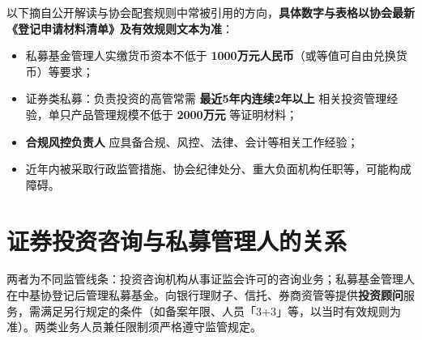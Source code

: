 以下摘自公开解读与协会配套规则中常被引用的方向，\textbf{具体数字与表格以协会最新《登记申请材料清单》及有效规则文本为准}：

\begin{itemize}
  \item 私募基金管理人实缴货币资本不低于 \textbf{1000万元人民币}（或等值可自由兑换货币）等要求；
  \item 证券类私募：负责投资的高管常需 \textbf{最近5年内连续2年以上} 相关投资管理经验，单只产品管理规模不低于 \textbf{2000万元} 等证明材料；
  \item \textbf{合规风控负责人} 应具备合规、风控、法律、会计等相关工作经验；
  \item 近年内被采取行政监管措施、协会纪律处分、重大负面机构任职等，可能构成障碍。
\end{itemize}

\section{证券投资咨询与私募管理人的关系}

两者为不同监管线条：投资咨询机构从事证监会许可的咨询业务；私募基金管理人在中基协登记后管理私募基金。向银行理财子、信托、券商资管等提供\textbf{投资顾问}服务，需满足另行规定的条件（如备案年限、人员「3+3」等，以当时有效规则为准）。两类业务人员兼任限制须严格遵守监管规定。
